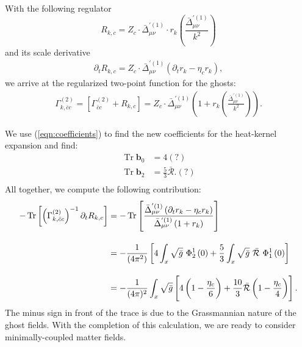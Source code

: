 With the following regulator 
\begin{equation}
	R_{k,c} = Z_c\cdot\bar{\Delta}_{\mu\nu}^{'(1)}\cdot r_k\left(\frac{\bar{\Delta}_{\mu\nu}^{'(1)}}{k^2}\right)
\end{equation}
and its scale derivative
\begin{align}
	\partial_t R_{k,c} =  Z_c\cdot\bar{\Delta}_{\mu\nu}^{'(1)}\left(\partial_tr_k - \eta_c r_k\right),
\end{align}
we arrive at the regularized two-point function for the ghosts: 
\begin{align}
	\Gamma^{(2)}_{k, \bar{c}c} = \left[\Gamma^{(2)}_{\bar{c}c}+ R_{k, c}\right]  = Z_c \cdot\bar{\Delta}_{\mu\nu}^{'(1)}\left(1 + r_k\left(\frac{\bar{\Delta}_{\mu\nu}^{'(1)}}{k^2}\right)\right).
\end{align}


We use (\ref{eqn:coefficients}) to find the new coefficients for the heat-kernel expansion and find:
\begin{equation}
\begin{aligned}
	\operatorname{Tr}\mathbf{b}_0 &= 4 (?) \\
	\operatorname{Tr}\mathbf{b}_2 &= \frac{5}{3}\bar{\mathcal{R}}. (?)\\
\end{aligned} 
\end{equation}
All together, we compute the following contribution:
\begin{equation}
\begin{aligned}
	-\operatorname{Tr}\left[ \left(\Gamma^{(2)}_{k, \bar{c}c}\right)^{-1}\partial_t R_{k,c} \right] &= -\operatorname{Tr}\left[ \frac{\bar{\Delta}_{\mu\nu}^{'(1)}\left(\partial_t r_k - \eta_c r_k\right)}{\bar{\Delta}_{\mu\nu}^{'(1)}\left(1 + r_k\right)} \right] \\[10pt]
	&=  - \frac{1}{\left(4 \pi^{2}\right)}\left[4\int_{x} \sqrt{\bar{g}}\ \Phi_{2}^{1}\left(0\right)+\frac{5}{3} \int_{x} \sqrt{\bar{g}} \ \bar{\mathcal{R}} \ \Phi_{1}^{1}\left(0\right)\right] \\[10pt]
	&= -\frac{1}{(4\pi)^2}\int_x\sqrt{\bar{g}}\left[4\left(1-\frac{\eta_c}{6}\right) + \frac{10}{3}\bar{\mathcal{R}}\left(1-\frac{\eta_c}{4}\right)\right].
\end{aligned}
\end{equation}
The minus sign in front of the trace is due to the Grassmannian nature of the ghost fields. With the completion of this calculation, we are ready to consider minimally-coupled matter fields.
